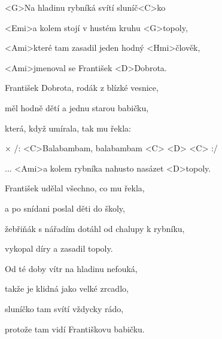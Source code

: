 

\zs
<G>Na hladinu rybníká svítí sluníč<C>ko

<Emi>a kolem stojí v hustém kruhu <G>topoly,

<Ami>které tam zasadil jeden hodný <Hmi>člověk,

<Ami>jmenoval se František <D>Dobrota.

\ks \zs
František Dobrota, rodák z blízké vesnice,

měl hodně dětí a jednu starou babičku,

která, když umírala, tak mu řekla: 
\ks

× /: <C>Balabambam, balabambam <C> <D> <C> :/

... <Ami>a kolem rybníka nahusto nasázet <D>topoly.
\kr

\zs
František udělal všechno, co mu řekla,

a po snídani poslal děti do školy,

žebřiňák s nářadím dotáhl od chalupy k rybníku,

vykopal díry a zasadil topoly.

\ks \zs
Od té doby vítr na hladinu nefouká,

takže je klidná jako velké zrcadlo,

sluníčko tam svítí vždycky rádo,

protože tam vidí Františkovu babičku.
\ks

\kp
